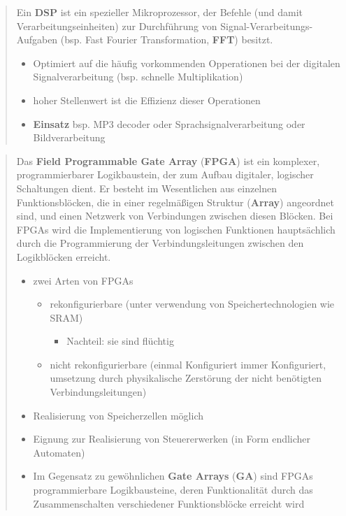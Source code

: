 \documentclass[
]{article}
\providecommand{\tightlist}{%
  \setlength{\itemsep}{0pt}\setlength{\parskip}{0pt}}
\begin{document}
\begin{quote}
Ein \textbf{DSP} ist ein spezieller Mikroprozessor, der Befehle (und
damit Verarbeitungseinheiten) zur Durchführung von
Signal-Verarbeitungs-Aufgaben (bsp. Fast Fourier Transformation,
\textbf{FFT}) besitzt.

\begin{itemize}
\tightlist
\item
  Optimiert auf die häufig vorkommenden Opperationen bei der digitalen
  Signalverarbeitung (bsp. schnelle Multiplikation)
\item
  hoher Stellenwert ist die Effizienz dieser Operationen
\item
  \textbf{Einsatz} bsp. MP3 decoder oder Sprachsignalverarbeitung oder
  Bildverarbeitung
\end{itemize}
\end{quote}

\begin{quote}
Das \textbf{Field Programmable Gate Array} (\textbf{FPGA}) ist ein
komplexer, programmierbarer Logikbaustein, der zum Aufbau digitaler,
logischer Schaltungen dient. Er besteht im Wesentlichen aus einzelnen
Funktionsblöcken, die in einer regelmäßigen Struktur (\textbf{Array})
angeordnet sind, und einen Netzwerk von Verbindungen zwischen diesen
Blöcken. Bei FPGAs wird die Implementierung von logischen Funktionen
hauptsächlich durch die Programmierung der Verbindungsleitungen zwischen
den Logikblöcken erreicht.

\begin{itemize}
\tightlist
\item
  zwei Arten von FPGAs

  \begin{itemize}
  \tightlist
  \item
    rekonfigurierbare (unter verwendung von Speichertechnologien wie
    SRAM)

    \begin{itemize}
    \tightlist
    \item
      Nachteil: sie sind flüchtig
    \end{itemize}
  \item
    nicht rekonfigurierbare (einmal Konfiguriert immer Konfiguriert,
    umsetzung durch physikalische Zerstörung der nicht benötigten
    Verbindungsleitungen)
  \end{itemize}
\item
  Realisierung von Speicherzellen möglich
\item
  Eignung zur Realisierung von Steuererwerken (in Form endlicher
  Automaten)
\item
  Im Gegensatz zu gewöhnlichen \textbf{Gate Arrays} (\textbf{GA}) sind
  FPGAs programmierbare Logikbausteine, deren Funktionalität durch das
  Zusammenschalten verschiedener Funktionsblöcke erreicht wird
\end{itemize}
\end{quote}
\end{document}
